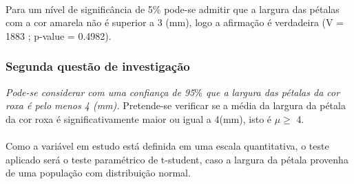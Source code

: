 \documentclass{article}
\begin{document}
\paragraph{}Para um nível de significância de 5$\%$ pode-se admitir que a largura das pétalas com a cor amarela não é superior a 3 (mm), logo a afirmação é verdadeira (V = 1883 ; p-value = 0.4982).
 
 
 \paragraph{}
 \paragraph{}
 \paragraph{}
 \paragraph{}
 \paragraph{}
 \paragraph{}
 \paragraph{}
 \paragraph{}
 
 \subsubsection{Segunda questão de investigação}
\textit{Pode-se considerar com uma confiança de 95$\%$ que a largura das pétalas  da cor roxa é pelo menos 4 (mm).}
Pretende-se verificar se a média da largura da pétala da cor roxa é significativamente maior ou igual a 4(mm), isto é \begin{math}\mu \geq \end{math} 4. 
\paragraph{} Como a variável em estudo está definida em uma escala quantitativa, o teste aplicado será o teste paramétrico de t-student, caso a largura da pétala provenha de uma população com distribuição normal.
\end{document}
